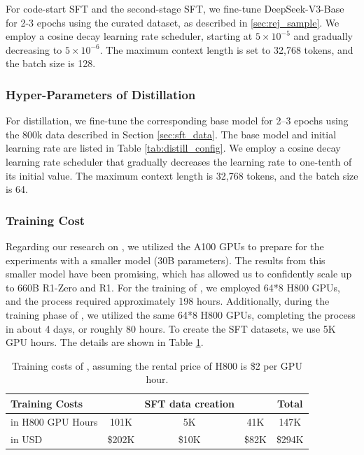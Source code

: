 For code-start SFT and the second-stage SFT,
we fine-tune DeepSeek-V3-Base for 2-3 epochs using the curated dataset, as described in \ref{sec:rej_sample}.
We employ a cosine decay learning rate scheduler, starting at \(5 \times 10^{-5}\) and gradually decreasing to \(5 \times 10^{-6}\). The maximum context length is set to 32,768 tokens, and the batch size is 128.



\subsubsection{Hyper-Parameters of Distillation}
\label{appendix:distill-params}

For distillation, we fine-tune the corresponding base model for 2–3 epochs using the 800k data described in Section \ref{sec:sft_data}. The base model and initial learning rate are listed in Table \ref{tab:distill_config}. We employ a cosine decay learning rate scheduler that gradually decreases the learning rate to one-tenth of its initial value. The maximum context length is 32,768 tokens, and the batch size is 64.



\subsubsection{Training Cost} \label{sec:cost}
Regarding our research on \dsri{}, we utilized the A100 GPUs to prepare for the experiments with a smaller model (30B parameters). The results from this smaller model have been promising, which has allowed us to confidently scale up to 660B R1-Zero and R1.
For the training of \dsro{}, we employed 64*8 H800 GPUs, and the process required approximately 198 hours. Additionally, during the training phase of \dsri{}, we utilized the same 64*8 H800 GPUs, completing the process in about 4 days, or roughly 80 hours. To create the SFT datasets, we use 5K GPU hours. The details are shown in Table \ref{tab:cost}.


\begin{table}[t]
    \centering
    \setlength{\tabcolsep}{6pt}
        \caption{
    Training costs of \dsri{}, assuming the rental price of H800 is \$2 per GPU hour.
    }
    \label{tab:cost}
    \begin{tabular}{l | c c c | c}
        \toprule
        \textbf{Training Costs} & \textbf{\dsro{}} & \textbf{SFT data creation} & \textbf{\dsri{}} & \textbf{Total} \\
        \midrule
        in H800 GPU Hours & 101K & 5K & 41K & 147K \\
        in USD & \$202K & \$10K & \$82K & \$294K \\
        \bottomrule
    \end{tabular}

\end{table}

